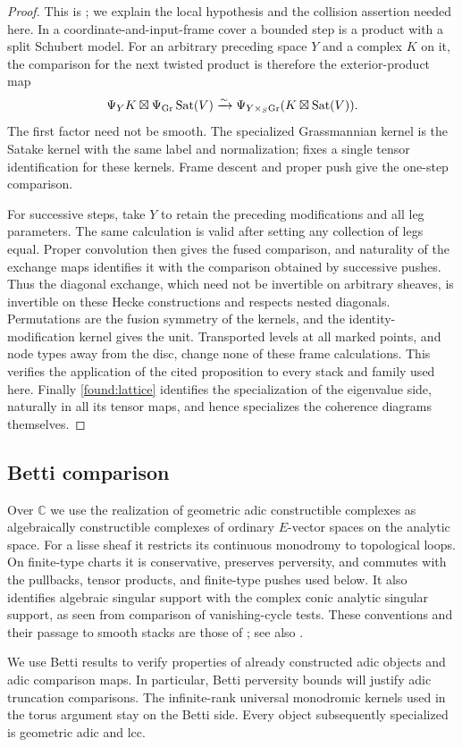 \begin{proof}
This is \cite[Proposition~5.1]{CT}; we explain the local hypothesis and
the collision assertion needed here.  In a coordinate-and-input-frame
cover a bounded step is a product with a split Schubert model.  For an
arbitrary preceding space $Y$ and a complex $K$ on it, the comparison
for the next twisted product is therefore the exterior-product map
\[
 \Psi_YK\boxtimes\Psi_{\operatorname{Gr}}\operatorname{Sat}(V)
 \xrightarrow{\sim}
 \Psi_{Y\times_S\operatorname{Gr}}(K\boxtimes\operatorname{Sat}(V)).
\]
The first factor need not be smooth.  The specialized Grassmannian
kernel is the Satake kernel with the same label and normalization;
\cite[Lemma~5.3]{CT} fixes a single tensor identification for these
kernels.  Frame descent and proper push give the one-step comparison.

For successive steps, take $Y$ to retain the preceding modifications
and all leg parameters.  The same calculation is valid after setting
any collection of legs equal.  Proper convolution then gives the fused
comparison, and naturality of the exchange maps identifies it with the
comparison obtained by successive pushes.  Thus the diagonal exchange,
which need not be invertible on arbitrary sheaves, is invertible on
these Hecke constructions and respects nested diagonals.  Permutations
are the fusion symmetry of the kernels, and the identity-modification
kernel gives the unit.  Transported levels at all marked points, and
node types away from the disc, change none of these frame calculations.
This verifies the application of the cited proposition to every stack
and family used here.  Finally \eqref{found:lattice} identifies the
specialization of the eigenvalue side, naturally in all its tensor
maps, and hence specializes the coherence diagrams themselves.
\end{proof}

\subsection{Betti comparison}
\label{found:betti}

Over $\mathbb C$ we use the realization of geometric adic constructible
complexes as algebraically constructible complexes of ordinary
$E$-vector spaces on the analytic space.  For a lisse sheaf it restricts
its continuous monodromy to topological loops.  On finite-type charts
it is conservative, preserves perversity, and commutes with the
pullbacks, tensor products, and finite-type pushes used below.  It also
identifies algebraic singular support with the complex conic analytic
singular support, as seen from comparison of vanishing-cycle tests.
These conventions and their passage to smooth stacks are those of
\cite[\S2.4]{CT}; see also \cite[\S2.2.1]{GR}.

We use Betti results to verify properties of already constructed adic
objects and adic comparison maps.  In particular, Betti perversity
bounds will justify adic truncation comparisons.  The infinite-rank
universal monodromic kernels used in the torus argument stay on the
Betti side.  Every object subsequently specialized is geometric adic
and lcc.
